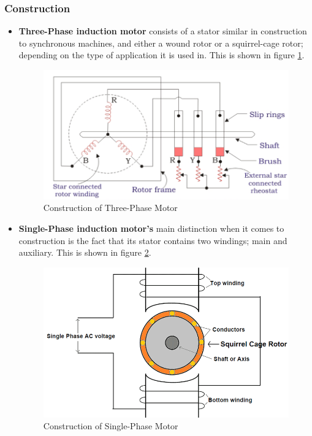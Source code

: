 \documentclass[journal]{IEEEtran}
\begin{document}
\subsubsection{Construction}
\begin{itemize}
    \item \textbf{Three-Phase induction motor} consists of a stator similar in construction to synchronous machines, and either a wound rotor or a squirrel-cage rotor; depending on the type of application it is used in\cite{tamer}. This is shown in figure \ref{fig:threecons}.
    \begin{figure}[h]
    \centering
    \includegraphics[scale=0.35]{Induction/three_construction.PNG}
    \caption{Construction of Three-Phase Motor \cite{three_construction}}
    \label{fig:threecons}
    \end{figure}
    
    \item \textbf{Single-Phase induction motor's} main distinction when it comes to construction is the fact that its stator contains two windings; main and auxiliary. This is shown in figure \ref{fig:singlecons}.
    \begin{figure}[h]
    \centering
    \includegraphics[scale=0.27]{Induction/Single-Phase-Induction-Motor (1).png}
    \caption{Construction of Single-Phase Motor \cite{single_construction}}
    \label{fig:singlecons}
    \end{figure}
\end{itemize}
\end{document}
